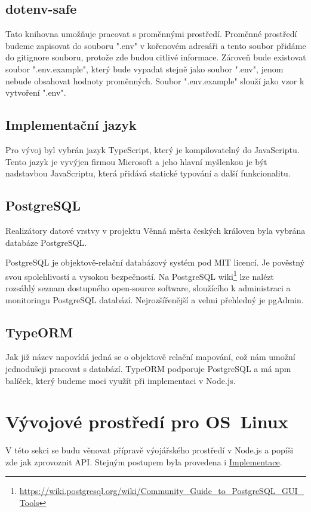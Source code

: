 \documentclass[thesis=B,czech]{FITthesis}[2012/06/26]
\begin{document}
        \subsection{dotenv-safe}
            Tato knihovna umožňuje pracovat s proměnnými prostředí. Proměnné prostředí budeme zapisovat do souboru ".env" v kořenovém adresáři a tento soubor přidáme do gitignore souboru, protože zde budou citlivé informace. Zároveň bude existovat soubor ".env.example", který bude vypadat stejně jako soubor ".env", jenom nebude obsahovat hodnoty proměnných. Soubor ".env.example" slouží jako vzor k vytvoření ".env". \cite{dotenv}
        \subsection{Implementační jazyk}
            Pro vývoj byl vybrán jazyk TypeScript, který je kompilovatelný do JavaScriptu. Tento jazyk je vyvýjen firmou Microsoft a jeho hlavní myšlenkou je být nadstavbou JavaScriptu, která přidává statické typování a další funkcionalitu.
        \subsection{PostgreSQL}
            Realizátory datové vrstvy v projektu Věnná města českých královen byla vybrána databáze PostgreSQL.
            
            PostgreSQL je objektově-relační databázový systém pod MIT licencí. Je pověstný svou spolehlivostí a vysokou bezpečností. Na PostgreSQL wiki\footnote{\url{https://wiki.postgresql.org/wiki/Community_Guide_to_PostgreSQL_GUI_Tools}} lze nalézt rozsáhlý seznam dostupného open-source software, sloužícího k administraci a monitoringu PostgreSQL databází. Nejrozšířenější a velmi přehledný je pgAdmin.
            \cite{postgres}
        \subsection{TypeORM}
            Jak již název napovídá jedná se o objektově relační mapování, což nám umožní jednodušeji pracovat s databází. TypeORM podporuje PostgreSQL a má npm balíček, který budeme moci využít při implementaci v Node.js.
            \cite{typeorm}
    \section{Vývojové prostředí pro OS~Linux}  \label{vyvProstredi}
        V této sekci se budu věnovat přípravě výojářského prostředí v Node.js a popíši zde jak zprovoznit API. Stejným postupem byla provedena i \hyperref[impl]{Implementace}.
        
\end{document}
